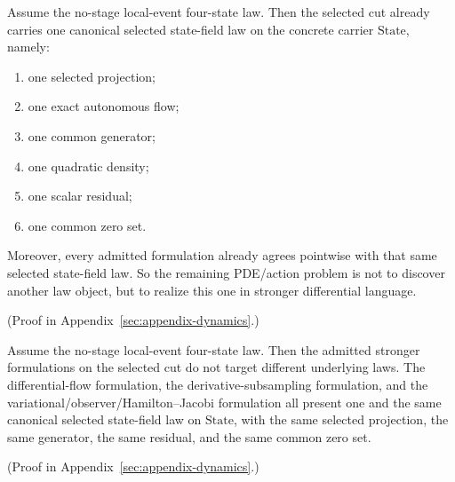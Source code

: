 \begin{corollary}
\label{cor:detached-selected-cut-already-carries-one-canonical-selected-state-field-law}
Assume the no-stage local-event four-state law. Then the selected cut already
carries one canonical selected state-field law on the concrete carrier
\(\mathrm{State}\), namely:
\begin{enumerate}[label=(\roman*), leftmargin=2em, itemsep=0.2em]
\item one selected projection;
\item one exact autonomous flow;
\item one common generator;
\item one quadratic density;
\item one scalar residual;
\item one common zero set.
\end{enumerate}
Moreover, every admitted formulation already agrees pointwise
with that same selected state-field law. So the remaining PDE/action problem is
not to discover another law object, but to realize this one in stronger
differential language.
\end{corollary}

(Proof in Appendix~\ref{sec:appendix-dynamics}.)

\begin{corollary}
\label{cor:current-stronger-realization-languages-already-present-one-same-selected-state-field-law}
Assume the no-stage local-event four-state law. Then the admitted stronger
formulations on the selected cut do not target different
underlying laws. The differential-flow formulation, the derivative-subsampling
formulation, and the variational/observer/Hamilton--Jacobi formulation all
present one and the same canonical selected state-field law on
\(\mathrm{State}\), with the same selected projection, the same generator, the
same residual, and the same common zero set.
\end{corollary}

(Proof in Appendix~\ref{sec:appendix-dynamics}.)


